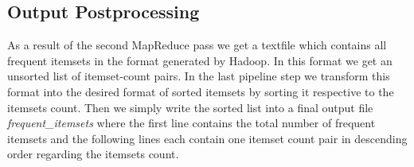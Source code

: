 \subsection{Output Postprocessing}\label{postprocessing}
As a result of the second MapReduce pass we get a textfile which contains all frequent itemsets in the format generated by Hadoop. In this format we get an unsorted list of itemset-count pairs. In the last pipeline step we transform this format into the desired format of sorted itemsets by sorting it respective to the itemsets count. Then we simply write the sorted list into a final output file \textit{frequent\_itemsets} where the first line contains the total number of frequent itemsets and the following lines each contain one itemset count pair in descending order regarding the itemsets count.